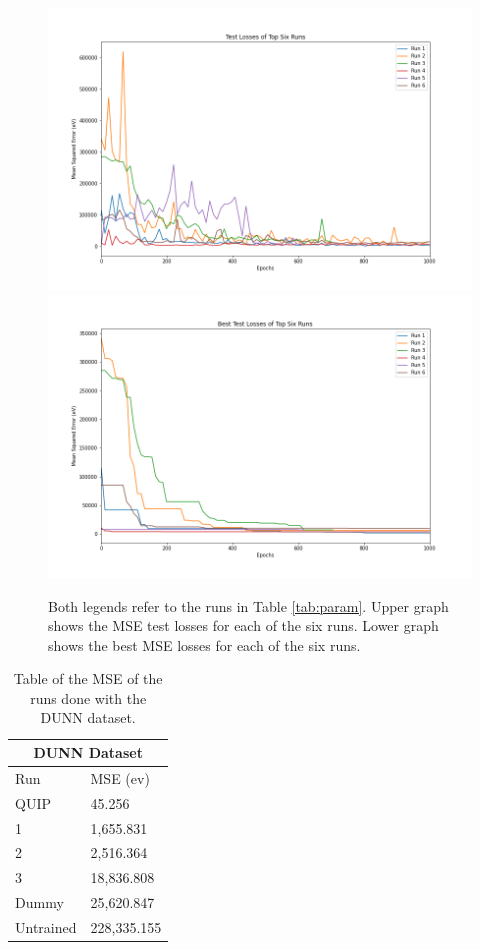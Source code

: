 \documentclass[12pt, abstract = true]{scrartcl}
\begin{document}
\begin{figure}
  \centering
  \includegraphics[scale=.5]{test.png}
  \includegraphics[scale=.5]{best.png}
  
  \caption{Both legends refer to the runs in Table \ref{tab:param}. Upper graph shows the MSE test losses for each of the six runs. Lower graph shows the best MSE losses for each of the six runs. }\label{fig:graph}
\end{figure}

\begin{table}
    \centering
    \begin{tabular}{p{3cm}|p{3cm}}
    \hline
    \multicolumn{2}{|c|}{DUNN Dataset} \\
    \hline
    Run  & MSE (ev)\\
    \hline
    QUIP   & 45.256\\
    1   & 1,655.831\\
    2    & 2,516.364\\
    3 & 18,836.808\\
    Dummy & 25,620.847\\
    Untrained & 228,335.155\\
    \hline
    \end{tabular}
    \caption{Table of the MSE of the runs done with the DUNN dataset.}\label{tab:dunn}
\end{table}
\end{document}
